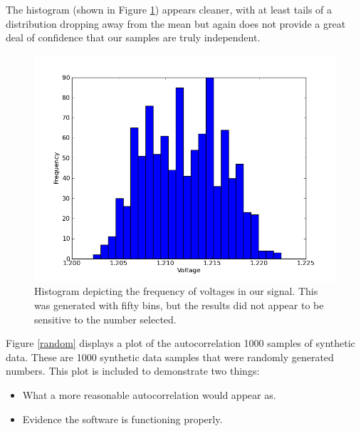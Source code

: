 \documentclass{article}
\begin{document}
The histogram (shown in Figure \ref{micro-hist}) appears cleaner, with
at least tails of a distribution dropping away from the mean but again
does not provide a great deal of confidence that our samples are truly
independent. 
  \begin{figure}[!htb]
   \begin{center}
    \includegraphics[width = 12 cm]{figs/micro_hist.png}
    \caption{Histogram depicting the frequency of voltages in our
    signal. This was generated with fifty bins, but the results did not
    appear to be sensitive to the number selected.}
    \label{micro-hist}
   \end{center}
  \end{figure}

Figure \ref{random} displays a plot of the autocorrelation 1000 samples
of synthetic data. These are 1000 synthetic data samples that were
randomly generated numbers. This plot is included to demonstrate two
things:  
\begin{itemize}
 \item What a more reasonable autocorrelation would appear as.
 \item Evidence the software is functioning properly.
\end{itemize}
\end{document}
